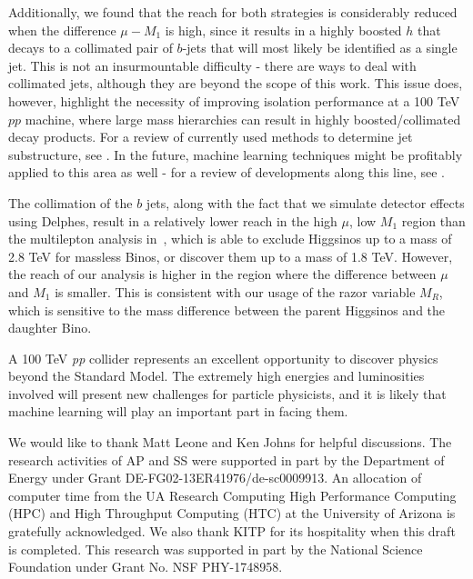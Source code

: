 \documentclass[a4paper,11pt]{article}
\begin{document}
Additionally, we found that the reach for both strategies is considerably
reduced when the difference $ \mu-M_1$ is high, since it results in a highly
boosted $h$ that decays to a collimated pair of $b$-jets that will most likely be
identified as a single jet. This is not an insurmountable difficulty - there are
ways to deal with collimated jets, although they are beyond the scope of this
work. This issue does, however, highlight the necessity of improving isolation
performance at a 100 TeV $pp$ machine, where large mass hierarchies can result in
highly boosted/collimated decay products. For a review of currently used methods
to determine jet substructure, see \cite{Shelton:2013an}. In the future,
machine learning techniques might be profitably applied to this area as well -
for a review of developments along this line, see \cite{Schwartzman:2016jqu}. 

The collimation of the $b$ jets, along with the fact that we simulate
detector effects using Delphes, result in a relatively lower reach in the high
$\mu$, low $M_1$ region than the multilepton analysis in~\cite{Gori:2014oua},
which is able to exclude Higgsinos up to a mass of 2.8 TeV for massless Binos,
or discover them up to a mass of 1.8 TeV. However, the reach of our analysis
is higher in the region where the difference between $\mu$ and $M_1$
is smaller. This is consistent with our usage of the razor variable $M_R$,
which is sensitive to the mass difference between the parent Higgsinos and the
daughter Bino.

A 100 TeV \emph{pp} collider represents an excellent opportunity to discover
physics beyond the Standard Model. The extremely high energies and luminosities
involved will present new challenges for particle physicists, and it is likely
that machine learning will play an important part in facing them. 
  
\acknowledgments

We would like to thank Matt Leone and Ken Johns for helpful discussions. The
research activities of AP and SS were supported in part by the Department of
Energy under Grant DE-FG02-13ER41976/de-sc0009913. An allocation of computer
time from the UA Research Computing High Performance Computing (HPC) and High
Throughput Computing (HTC) at the University of Arizona is gratefully
acknowledged. We also thank KITP for its hospitality when this draft is completed.
This research was supported in part by the National Science Foundation under Grant No. NSF PHY-1748958.


\end{document}

